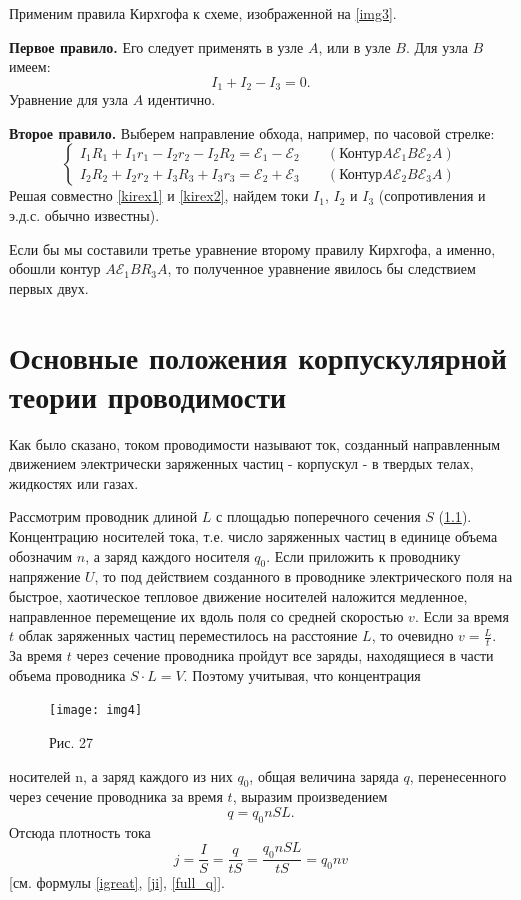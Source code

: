 \documentclass[a4paper,10pt]{book}
\begin{document}
Применим правила Кирхгофа к схеме, изображенной на \ref{img3}.

\textbf{Первое правило.} Его следует применять в узле $A$, или в узле $B$. Для узла $B$ имеем:
\begin{equation}\label{kirex1}
 I_1 + I_2 - I_3 = 0.
\end{equation}
Уравнение для узла $A$ идентично.

\textbf{Второе правило.} Выберем направление обхода, например, по часовой стрелке:
\begin{equation}\label{kirex2}
 \begin{cases}
    I_1R_1 + I_1r_1 - I_2r_2 - I_2R_2 = \mathcal{E}_1 - \mathcal{E}_2 \;\;\;\;\;\;\;(\text{Контур} A\mathcal{E}_1B\mathcal{E}_2A)\\
    I_2R_2 + I_2r_2 + I_3R_3 + I_3r_3 = \mathcal{E}_2 + \mathcal{E}_3 \;\;\;\;\;\;\;(\text{Контур} A\mathcal{E}_2B\mathcal{E}_3A)
 \end{cases}
\end{equation}
Решая совместно \ref{kirex1} и \ref{kirex2}, найдем токи $I_1$, $I_2$ и $I_3$ (сопротивления и э.д.с. обычно известны).

Если бы мы составили третье уравнение  второму правилу Кирхгофа, а именно, обошли контур $A\mathcal{E}_1BR_3A$, то полученное уравнение явилось бы следствием первых двух.
\chapter{Основные положения корпускулярной теории проводимости}
Как было сказано, током проводимости называют ток, созданный направленным движением электрически заряженных частиц - корпускул - в твердых телах, жидкостях или газах.
 
Рассмотрим проводник длиной $L$ с площадью поперечного сечения $S$ (\ref{img4}). Концентрацию носителей тока, т.е. число заряженных частиц в единице объема обозначим $n$, а заряд каждого носителя $q_0$. Если приложить к проводнику напряжение $U$, то под действием созданного в проводнике электрического поля на быстрое, хаотическое тепловое движение носителей наложится медленное, направленное перемещение их вдоль поля со средней скоростью $v$. Если за время $t$ облак заряженных частиц переместилось на расстояние $L$, то очевидно $v = \frac{L}{t}$. За время $t$ через сечение проводника пройдут все заряды, находящиеся в части объема проводника $S\cdot L = V$. Поэтому учитывая, что концентрация
\begin{figure}[h]
\texttt{[image: img4]}
\caption{Рис. 27}
\label{img4}
\end{figure}
носителей n, а заряд каждого из них $q_0$, общая величина заряда $q$, перенесенного через сечение проводника за время $t$, выразим произведением
\begin{equation}\label{full_q}
 q = q_0nSL.
\end{equation}
Отсюда плотность тока
\begin{equation}\label{density}
 j = \frac{I}{S} = \frac{q}{tS} = \frac{q_0nSL}{tS} = q_0nv
\end{equation}
[см. формулы \ref{igreat}, \ref{ji}, \ref{full_q}].
\end{document}
